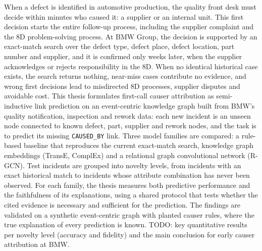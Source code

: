 \documentclass[
  12pt,
  a4paper,
  twoside=false,     %
  parskip,
  listof=totoc,      %
  bibliography=totoc %
]{scrbook}
\begin{document}
When a defect is identified in automotive production, the quality front desk
must decide within minutes who caused it: a supplier or an internal unit. This
first decision starts the entire follow-up process, including the supplier
complaint and the 8D problem-solving process. At BMW Group, the decision is
supported by an exact-match search over the defect type, defect place, defect
location, part number and supplier, and it is confirmed only weeks later, when
the supplier acknowledges or rejects responsibility in the 8D. When no
identical historical case exists, the search returns nothing, near-miss cases
contribute no evidence, and wrong first decisions lead to misdirected 8D
processes, supplier disputes and avoidable cost.
This thesis formulates first-call causer attribution as semi-inductive link
prediction on an event-centric knowledge graph built from BMW's quality
notification, inspection and rework data: each new incident is an unseen node
connected to known defect, part, supplier and rework nodes, and the task is to
predict its missing \texttt{CAUSED\_BY} link. Three model families are
compared: a rule-based baseline that reproduces the current exact-match
search, knowledge graph embeddings (TransE, ComplEx) and a relational graph
convolutional network (R-GCN). Test incidents are grouped into novelty levels,
from incidents with an exact historical match to incidents whose attribute
combination has never been observed. For each family, the thesis measures
both predictive performance and the faithfulness of its explanations, using a
shared protocol that tests whether the cited evidence is necessary and
sufficient for the prediction.
The findings are validated on a synthetic event-centric graph with planted
causer rules, where the true explanation of every prediction is known.
TODO: key quantitative results per novelty level (accuracy and fidelity) and
the main conclusion for early causer attribution at BMW.
\end{document}
